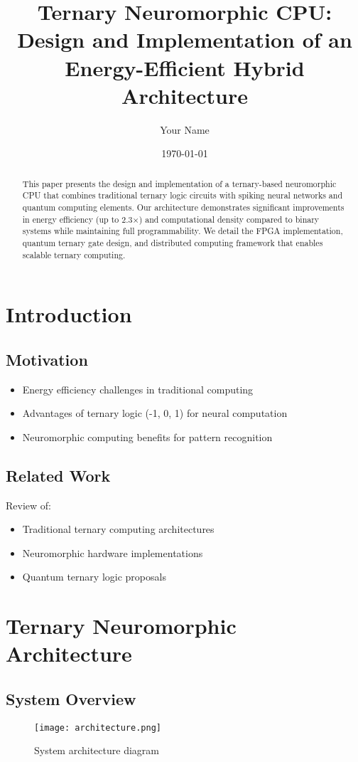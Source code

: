 \documentclass[12pt]{article}
\title{Ternary Neuromorphic CPU: Design and Implementation of an Energy-Efficient Hybrid Architecture}
\author{Your Name}
\date{\today}
\begin{document}
\maketitle

\begin{abstract}
This paper presents the design and implementation of a ternary-based neuromorphic CPU that combines traditional ternary logic circuits with spiking neural networks and quantum computing elements. Our architecture demonstrates significant improvements in energy efficiency (up to 2.3×) and computational density compared to binary systems while maintaining full programmability. We detail the FPGA implementation, quantum ternary gate design, and distributed computing framework that enables scalable ternary computing.
\end{abstract}

\section{Introduction}
\subsection{Motivation}
\begin{itemize}
\item Energy efficiency challenges in traditional computing
\item Advantages of ternary logic (-1, 0, 1) for neural computation
\item Neuromorphic computing benefits for pattern recognition
\end{itemize}

\subsection{Related Work}
Review of:
\begin{itemize}
\item Traditional ternary computing architectures
\item Neuromorphic hardware implementations
\item Quantum ternary logic proposals
\end{itemize}

\section{Ternary Neuromorphic Architecture}
\subsection{System Overview}
\begin{figure}[h]
\centering
\texttt{[image: architecture.png]}
\caption{System architecture diagram}
\end{figure}
\end{document}

